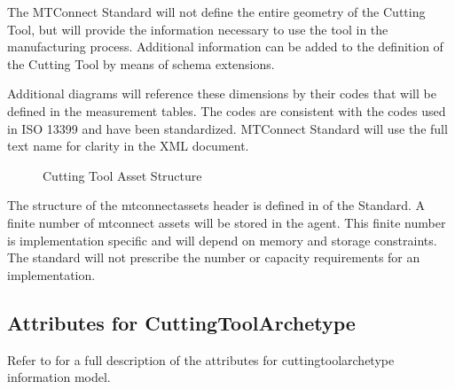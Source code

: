 \FloatBarrier

The MTConnect Standard will not define the entire geometry of the Cutting Tool, but will provide the information necessary to use the tool in the manufacturing process.  Additional information can be added to the definition of the Cutting Tool by means of schema extensions.

Additional diagrams will reference these dimensions by their codes that will be defined in the measurement tables.  The codes are consistent with the codes used in ISO 13399 and have been standardized.  MTConnect Standard will use the full text name for clarity in the XML document. 

\begin{figure}[ht]
  \centering
  \caption{Cutting Tool Asset Structure}
  \label{fig:cutting-tool-asset-structure}
\end{figure}

\FloatBarrier

The structure of the \gls{mtconnectassets} header is defined in  of the Standard.  A finite number of \glspl{mtconnect asset} will be stored in the \gls{agent}.  This finite number is implementation specific and will depend on memory and storage constraints. The standard will not prescribe the number or capacity requirements for an implementation.

\subsection{Attributes for CuttingToolArchetype}

Refer to  for a full description of the attributes for \gls{cuttingtoolarchetype} \gls{information model}.

